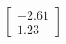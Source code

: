 \documentclass[preview]{standalone}
\begin{document}
\begin{align*}
\begin{bmatrix} -2.61 \\ 1.23 \end{bmatrix}
\end{align*}
\end{document}
